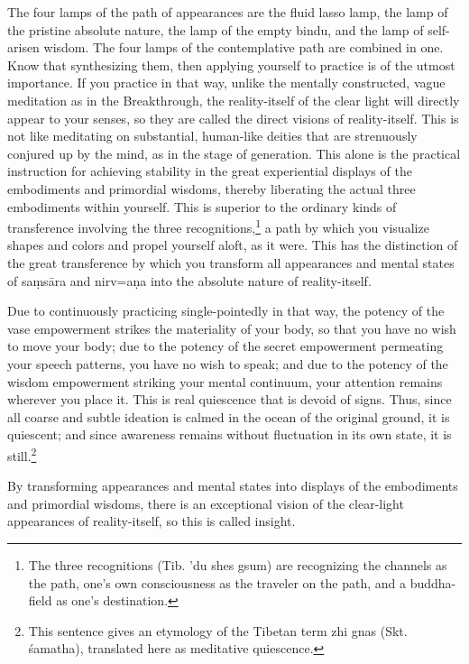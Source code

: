 \documentclass[11pt,twocolumn]{article}
\begin{document}
The four lamps of the path of appearances are the fluid lasso lamp,
the lamp of the pristine absolute nature, the lamp of the empty bindu,
and the lamp of self\hyp{}arisen wisdom. The four lamps of the
contemplative path are combined in one. Know that synthesizing them,
then applying yourself to practice is of the utmost importance. If you
practice in that way, unlike the mentally constructed, vague
meditation as in the Breakthrough, the reality\hyp{}itself of the
clear light will directly appear to your senses, so they are called
the direct visions of reality\hyp{}itself. This is not like meditating
on substantial, human\hyp{}like deities that are strenuously conjured
up by the mind, as in the stage of generation. This alone is the
practical instruction for achieving stability in the great
experiential displays of the embodiments and primordial wisdoms,
thereby liberating the actual three embodiments within yourself. This
is superior to the ordinary kinds of transference involving the three
recognitions,\footnote{The three recognitions (Tib. 'du shes gsum) are
  recognizing the channels as the path, one's own consciousness as the
  traveler on the path, and a buddha\hyp{}field as one's destination.}
a path by which you visualize shapes and colors and propel yourself
aloft, as it were. This has the distinction of the great transference
by which you transform all appearances and mental states of
sa\d{m}s\={a}ra and nirv\a={a}\d{n}a into the absolute nature of
reality\hyp{}itself.

Due to continuously practicing single\hyp{}pointedly in that way, the
potency of the vase empowerment strikes the materiality of your body,
so that you have no wish to move your body; due to the potency of the
secret empowerment permeating your speech patterns, you have no wish
to speak; and due to the potency of the wisdom empowerment striking
your mental continuum, your attention remains wherever you place
it. This is real quiescence that is devoid of signs. Thus, since all
coarse and subtle ideation is calmed in the ocean of the original
ground, it is quiescent; and since awareness remains without
fluctuation in its own state, it is still.\footnote{This sentence
  gives an etymology of the Tibetan term zhi gnas (Skt. \'{s}amatha),
  translated here as meditative quiescence.}

By transforming appearances and mental states into displays of the
embodiments and primordial wisdoms, there is an exceptional vision of
the clear\hyp{}light appearances of reality\hyp{}itself, so this is
called insight.
\end{document}
